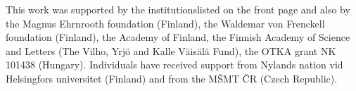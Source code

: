 This work was supported by the institutions\Break listed on the front page and also by the 
Magnus Ehrnrooth foundation (Finland), the Waldemar von Frenckell foundation (Finland), 
the Academy of Finland, the Finnish Academy of Science and Letters (The Vilho, Yrj\"o and Kalle V\"ais\"al\"a Fund), 
the OTKA grant NK 101438 (Hungary). Individuals have received support from Nylands nation vid Helsingfors universitet (Finland) 
and from the M\v SMT \v CR (Czech Republic).

